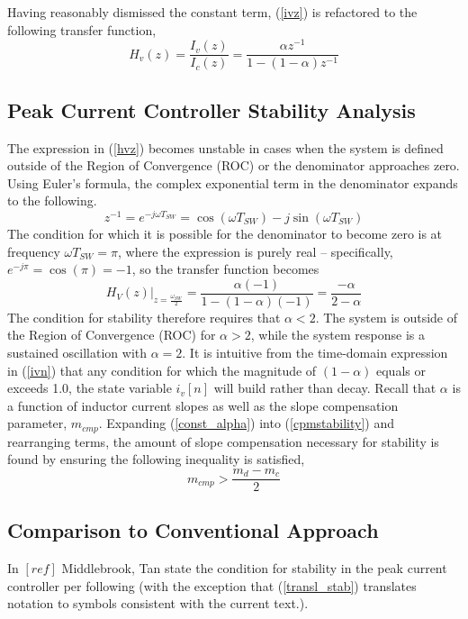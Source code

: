 \documentclass[conference]{IEEEtran}
\begin{document}
Having reasonably dismissed the constant term, (\ref{ivz}) is refactored to the following transfer function,
\begin{equation}
H_v(z) = \frac {I_v(z)} {I_c(z)} = \frac {\alpha z^{-1}} {1 - (1-\alpha) z^{-1}}  \label{hvz}
\end{equation}


\subsection{Peak Current Controller Stability Analysis}

The expression in (\ref{hvz}) becomes unstable in cases when the system is defined outside of the Region of Convergence (ROC) or the denominator approaches zero. Using Euler's formula, the complex exponential term in the denominator expands to the following.
\begin{equation}
	z^{-1} = e^{-j \omega T_{SW}} = \cos (\omega T_{SW}) - j \sin (\omega T_{SW}) 
\end{equation} 
The condition for which it is possible for the denominator to become zero is at frequency $\omega T_{SW} = \pi$, where the expression is purely real -- specifically, $e^{-j \pi} = \cos ( \pi) = -1$, so the transfer function becomes
\begin{equation}
H_V(z) \bigg|_{z=\frac{\omega_{SW}}{2}} = \dfrac{\alpha (-1)}{1 - (1 - \alpha) (-1)} = \dfrac{- \alpha}{2 - \alpha} \label{cpmstability}
\end{equation}
The condition for stability therefore requires that $\alpha < 2$.  The system is outside of the Region of Convergence (ROC) for $\alpha > 2$, while the system response is a sustained oscillation with $\alpha = 2$. It is intuitive from the time-domain expression in (\ref{ivn}) that any condition for which the magnitude of $(1 - \alpha)$ equals or exceeds 1.0, the state variable $i_v[n]$ will build rather than decay.
Recall that $\alpha$ is a function of inductor current slopes as well as the slope compensation parameter, $m_{cmp}$.  Expanding (\ref{const_alpha}) into (\ref{cpmstability}) and rearranging terms, the amount of slope compensation necessary for stability is found by ensuring the following inequality is satisfied,
\begin{equation}
m_{cmp} > \dfrac{m_d - m_c}{2} \label{slope_stab}
\end{equation}

\subsection{Comparison to Conventional Approach}
In $[ref]$ Middlebrook, Tan state the condition for stability in the peak current controller per following (with the exception that (\ref{transl_stab}) translates notation to symbols consistent with the current text.).
\end{document}
